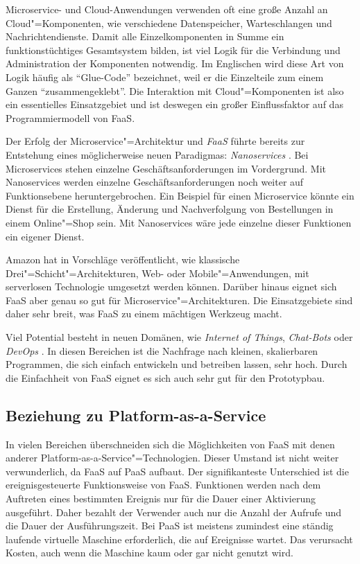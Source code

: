 Microservice- und Cloud-Anwendungen verwenden oft eine große Anzahl an Cloud"=Komponenten, wie verschiedene Datenspeicher, Warteschlangen und Nachrichtendienste. Damit alle Einzelkomponenten in Summe ein funktionstüchtiges Gesamtsystem bilden, ist viel Logik für die Verbindung und Administration der Komponenten notwendig. Im Englischen wird diese Art von Logik häufig als "`Glue-Code"' bezeichnet, weil er die Einzelteile zum einem Ganzen "`zusammengeklebt"'. Die Interaktion mit Cloud"=Komponenten ist also ein essentielles Einsatzgebiet und ist deswegen ein großer Einflussfaktor auf das Programmiermodell von FaaS.

Der Erfolg der Microservice"=Architektur und \textit{FaaS} führte bereits zur Entstehung eines möglicherweise neuen Paradigmas: \textit{Nanoservices} \cite{infoqFaaS}. Bei Microservices stehen einzelne Geschäftsanforderungen im Vordergrund. Mit Nanoservices werden einzelne Geschäftsanforderungen noch weiter auf Funktionsebene heruntergebrochen. Ein Beispiel für einen Microservice könnte ein Dienst für die Erstellung, Änderung und Nachverfolgung von Bestellungen in einem Online"=Shop sein. Mit Nanoservices wäre jede einzelne dieser Funktionen ein eigener Dienst.

Amazon hat in \cite{AwsMultiTier} Vorschläge veröffentlicht, wie klassische Drei"=Schicht"=Architekturen, \zB Web- oder Mobile"=Anwendungen, mit serverlosen Technologie umgesetzt werden können. Darüber hinaus eignet sich FaaS aber genau so gut für Microservice"=Architekturen. Die Einsatzgebiete sind daher sehr breit, was FaaS zu einem mächtigen Werkzeug macht.

Viel Potential besteht in neuen Domänen, wie \textit{Internet of Things}, \textit{Chat-Bots} oder \textit{DevOps} \cite{NewStackAzurePreview}. In diesen Bereichen ist die Nachfrage nach kleinen, skalierbaren Programmen, die sich einfach entwickeln und betreiben lassen, sehr hoch. Durch die Einfachheit von FaaS eignet es sich auch sehr gut für den Prototypbau.

\subsection{Beziehung zu Platform-as-a-Service}

In vielen Bereichen überschneiden sich die Möglichkeiten von FaaS mit denen anderer Platform-as-a-Service"=Technologien. Dieser Umstand ist nicht weiter verwunderlich, da FaaS auf PaaS aufbaut. Der signifikanteste Unterschied ist die ereignisgesteuerte Funktionsweise von FaaS. Funktionen werden nach dem Auftreten eines bestimmten Ereignis nur für die Dauer einer Aktivierung ausgeführt. Daher bezahlt der Verwender auch nur die Anzahl der Aufrufe und die Dauer der Ausführungszeit. Bei PaaS ist meistens zumindest eine ständig laufende virtuelle Maschine erforderlich, die auf Ereignisse wartet. Das verursacht Kosten, auch wenn die Maschine kaum oder gar nicht genutzt wird.


